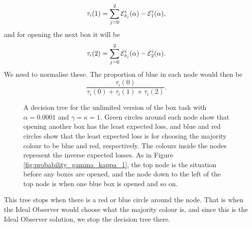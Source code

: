 \begin{equation*}
    \tau_i(1) = \sum_{j=0}^2 \mathcal{E}_{\delta_j}^i(\alpha) - \mathcal{E}_1^i(\alpha),
\end{equation*}
and for opening the next box it will be
\begin{equation*}
    \tau_i(2) = \sum_{j=0}^2 \mathcal{E}_{\delta_j}^i(\alpha) - \mathcal{E}_2^i(\alpha).
\end{equation*}
We need to normalise these. The proportion of blue in each node would then be
\begin{equation*}
    \frac{\tau_i(0)}{\tau_i(0)+\tau_i(1)+\tau_i(2)}.
\end{equation*}
\begin{figure}
    \centering
    \scalebox{0.7}{}
    \caption[IO solution, unlimited. $\alpha=0.0001$, $\gamma=\kappa=1$]{A decision tree for the unlimited version of the box task with $\alpha = 0.0001$ and $\gamma=\kappa=1$. Green circles around each node show that opening another box has the least expected loss, and blue and red circles show that the least expected loss is for choosing the majority colour to be blue and red, respectively. The colours inside the nodes represent the inverse expected losses. As in Figure \ref{fig:probability_gamma_kappa_1}, the top node is the situation before any boxes are opened, and the node down to the left of the top node is when one blue box is opened and so on.}
    \label{fig:unlim_a0.0001_gk1}
\end{figure}
This tree stops when there is a red or blue circle around the node. That is when the Ideal Observer would choose what the majority colour is, and since this is the Ideal Observer solution, we stop the decision tree there. 



